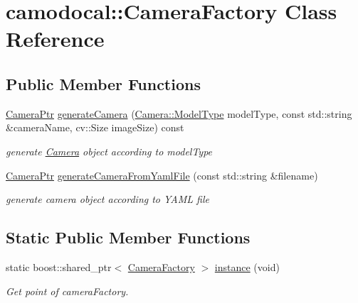 \hypertarget{classcamodocal_1_1CameraFactory}{}\section{camodocal\+:\+:Camera\+Factory Class Reference}
\label{classcamodocal_1_1CameraFactory}
\subsection*{Public Member Functions}
\begin{DoxyCompactItemize}
\item 
\hyperlink{Camera_8h_a9f66c7d396fa23ffb2a4512670a78b84}{Camera\+Ptr} \hyperlink{classcamodocal_1_1CameraFactory_a853fe9e847faae5caa3981f87a9ab7c8}{generate\+Camera} (\hyperlink{classcamodocal_1_1Camera_a663bb19b7b1f38f6d1b7eeb0890183ff}{Camera\+::\+Model\+Type} model\+Type, const std\+::string \&camera\+Name, cv\+::\+Size image\+Size) const
\begin{DoxyCompactList}\small\item\em generate \hyperlink{classcamodocal_1_1Camera}{Camera} object according to model\+Type \end{DoxyCompactList}\item 
\hyperlink{Camera_8h_a9f66c7d396fa23ffb2a4512670a78b84}{Camera\+Ptr} \hyperlink{classcamodocal_1_1CameraFactory_a8362492960d68a4ae43c40a1952df3a5}{generate\+Camera\+From\+Yaml\+File} (const std\+::string \&filename)
\begin{DoxyCompactList}\small\item\em generate camera object according to Y\+A\+ML file \end{DoxyCompactList}\end{DoxyCompactItemize}
\subsection*{Static Public Member Functions}
\begin{DoxyCompactItemize}
\item 
static boost\+::shared\+\_\+ptr$<$ \hyperlink{classcamodocal_1_1CameraFactory}{Camera\+Factory} $>$ \hyperlink{classcamodocal_1_1CameraFactory_a64645e95b821303ea4b550cb18f2641c}{instance} (void)
\begin{DoxyCompactList}\small\item\em Get point of camera\+Factory. \end{DoxyCompactList}\end{DoxyCompactItemize}


